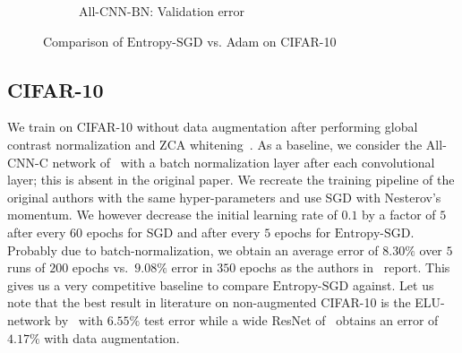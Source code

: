 \documentclass[10pt]{article}
\newcommand{\entropysgd}{\mathrm{Entropy}\textrm{-}\mathrm{SGD}}
\newcommand{\allcnn}{\textrm{All-CNN-BN}}
\begin{document}
\begin{figure}[htp!]
\begin{subfigure}[b]{0.45\textwidth}
        \caption{\small $\allcnn$: Validation error}
        \label{fig:allcnn_valid}
    \end{subfigure}
\caption{\small Comparison of $\entropysgd$ vs. Adam on CIFAR-10}
\label{fig:allcnn}
\end{figure}

\subsection{CIFAR-10}
\label{ss:expt:cifar}

We train on CIFAR-10 without data augmentation after performing global contrast normalization and ZCA whitening~\citep{goodfellow2013maxout}. As a baseline, we consider the All-CNN-C network of~\citet{springenberg2014striving} with a batch normalization layer after each convolutional layer; this is absent in the original paper. We recreate the training pipeline of the original authors with the same hyper-parameters and use SGD with Nesterov's momentum. We however decrease the initial learning rate of $0.1$ by a factor of $5$ after every $60$ epochs for SGD and after every $5$ epochs for $\entropysgd$. Probably due to batch-normalization, we obtain an average error of $8.30\%$ over $5$ runs of $200$ epochs vs.\ $9.08\%$ error in $350$ epochs as the authors in~\citet{springenberg2014striving} report. This gives us a very competitive baseline to compare $\entropysgd$ against. Let us note that the best result in literature on non-augmented CIFAR-10 is the ELU-network by~\citet{clevert2015fast} with $6.55\%$ test error while a wide ResNet of~\citet{zagoruyko2016wide} obtains an error of $4.17\%$ with data augmentation.

\end{document}
